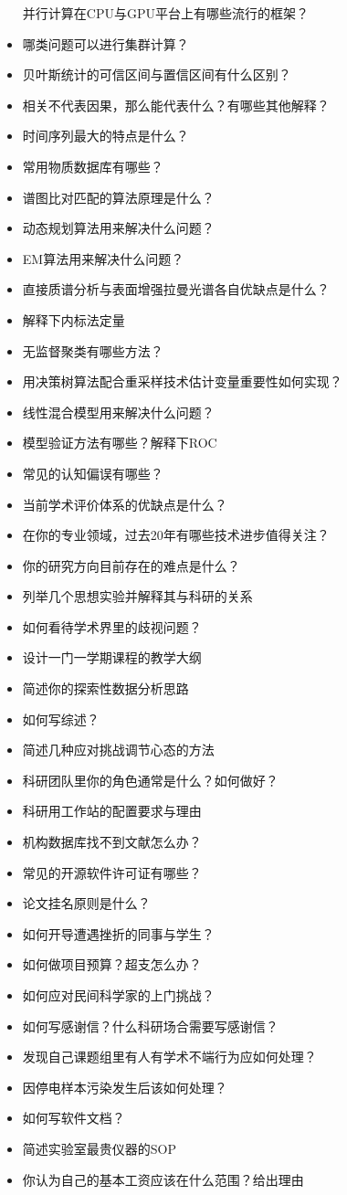 \documentclass[]{tufte-book}
\begin{document}
\begin{itemize}
  并行计算在CPU与GPU平台上有哪些流行的框架？
\item
  哪类问题可以进行集群计算？
\item
  贝叶斯统计的可信区间与置信区间有什么区别？
\item
  相关不代表因果，那么能代表什么？有哪些其他解释？
\item
  时间序列最大的特点是什么？
\item
  常用物质数据库有哪些？
\item
  谱图比对匹配的算法原理是什么？
\item
  动态规划算法用来解决什么问题？
\item
  EM算法用来解决什么问题？
\item
  直接质谱分析与表面增强拉曼光谱各自优缺点是什么？
\item
  解释下内标法定量
\item
  无监督聚类有哪些方法？
\item
  用决策树算法配合重采样技术估计变量重要性如何实现？
\item
  线性混合模型用来解决什么问题？
\item
  模型验证方法有哪些？解释下ROC
\item
  常见的认知偏误有哪些？
\item
  当前学术评价体系的优缺点是什么？
\item
  在你的专业领域，过去20年有哪些技术进步值得关注？
\item
  你的研究方向目前存在的难点是什么？
\item
  列举几个思想实验并解释其与科研的关系
\item
  如何看待学术界里的歧视问题？
\item
  设计一门一学期课程的教学大纲
\item
  简述你的探索性数据分析思路
\item
  如何写综述？
\item
  简述几种应对挑战调节心态的方法
\item
  科研团队里你的角色通常是什么？如何做好？
\item
  科研用工作站的配置要求与理由
\item
  机构数据库找不到文献怎么办？
\item
  常见的开源软件许可证有哪些？
\item
  论文挂名原则是什么？
\item
  如何开导遭遇挫折的同事与学生？
\item
  如何做项目预算？超支怎么办？
\item
  如何应对民间科学家的上门挑战？
\item
  如何写感谢信？什么科研场合需要写感谢信？
\item
  发现自己课题组里有人有学术不端行为应如何处理？
\item
  因停电样本污染发生后该如何处理？
\item
  如何写软件文档？
\item
  简述实验室最贵仪器的SOP
\item
  你认为自己的基本工资应该在什么范围？给出理由
\end{itemize}
\end{document}
